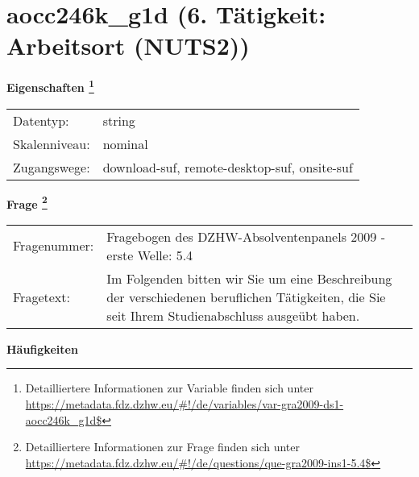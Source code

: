 
    \setcounter{footnote}{0}

    \vspace*{-1.8cm}
	\section{aocc246k\_g1d (6. Tätigkeit: Arbeitsort (NUTS2))}
	\label{section:aocc246k_g1d}



    \vspace*{0.5cm}
    \noindent\textbf{Eigenschaften
	\footnote{Detailliertere Informationen zur Variable finden sich unter
		\url{https://metadata.fdz.dzhw.eu/\#!/de/variables/var-gra2009-ds1-aocc246k_g1d$}}}\\
	\begin{tabularx}{\hsize}{@{}lX}
	Datentyp: & string \\
	Skalenniveau: & nominal \\
	Zugangswege: &
	  download-suf, 
	  remote-desktop-suf, 
	  onsite-suf
 \\
    \end{tabularx}



				\vspace*{0.5cm}
                \noindent\textbf{Frage
	                \footnote{Detailliertere Informationen zur Frage finden sich unter
		              \url{https://metadata.fdz.dzhw.eu/\#!/de/questions/que-gra2009-ins1-5.4$}}}\\
				\begin{tabularx}{\hsize}{@{}lX}
					Fragenummer: &
					  Fragebogen des DZHW-Absolventenpanels 2009 - erste Welle:
					  5.4
 \\
					Fragetext: & Im Folgenden bitten wir Sie um eine Beschreibung der verschiedenen beruflichen Tätigkeiten, die Sie seit Ihrem Studienabschluss ausgeübt haben. \\
				\end{tabularx}





        		\vspace*{0.5cm}
                \noindent\textbf{Häufigkeiten}

